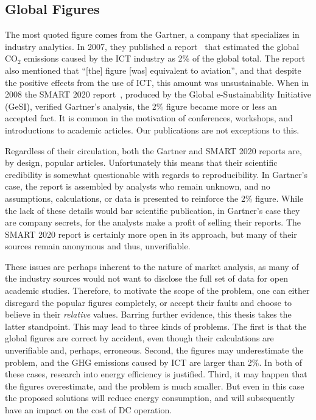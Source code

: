\documentclass[officiallayout]{tktla}
\begin{document}
\subsection{Global Figures}

The most quoted figure comes from the Gartner, a company that specializes in
industry analytics. In 2007, they published a report~\cite{Gartner2007} that
estimated the global CO$_2$ emissions caused by the ICT industry as 2\% of the
global total. The report also mentioned that ``[the] figure [was] equivalent
to aviation'', and that despite the positive effects from the use of ICT, this
amount was unsustainable. When in 2008 the SMART 2020 report~\cite{Webb2008},
produced by the Global e-Sustainability Initiative (GeSI), verified Gartner's
analysis, the 2\% figure became more or less an accepted fact. It is common in
the motivation of conferences, workshops, and introductions to academic
articles. Our publications are not exceptions to this.

Regardless of their circulation, both the Gartner and SMART 2020 reports are,
by design, popular articles. Unfortunately this means that their scientific
credibility is somewhat questionable with regards to reproducibility. In
Gartner's case, the report is assembled by analysts who remain unknown, and no
assumptions, calculations, or data is presented to reinforce the 2\% figure.
While the lack of these details would bar scientific publication, in Gartner's
case they are company secrets, for the analysts make a profit of selling their
reports. The SMART 2020 report is certainly more open in its approach, but
many of their sources remain anonymous and thus, unverifiable.

These issues are perhaps inherent to the nature of market analysis, as many of
the industry sources would not want to disclose the full set of data for open
academic studies. Therefore, to motivate the scope of the problem, one can
either disregard the popular figures completely, or accept their faults and
choose to believe in their \emph{relative} values. Barring further evidence,
this thesis takes the latter standpoint. This may lead to three kinds of
problems. The first is that the global figures are correct by accident, even
though their calculations are unverifiable and, perhaps, erroneous. Second,
the figures may underestimate the problem, and the GHG emissions caused by ICT
are larger than 2\%. In both of these cases, research into energy efficiency
is justified. Third, it may happen that the figures overestimate, and the
problem is much smaller. But even in this case the proposed solutions will
reduce energy consumption, and will subsequently have an impact on the cost of
DC operation.
\end{document}
